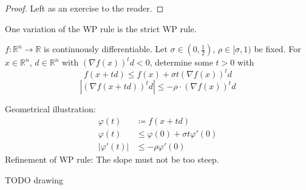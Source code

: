\documentclass[a4paper]{article}
\numberwithin{lecref}{subsection}
\newcommand{\Abs}[1]{\left|#1\right|}
\begin{document}
\begin{proof}
	Left as an exercise to the reader.
\end{proof}

One variation of the WP rule is the strict WP rule.

$f: \mathbb R^n \to \mathbb R$ is continuously differentiable.
Let $\sigma \in (0, \frac12)$, $\rho \in [\sigma, 1)$ be fixed.
For $x \in \mathbb R^n$, $d \in \mathbb R^n$ with $(\nabla f(x))^t d < 0$, determine some $t > 0$ with
\[ f(x + td) \leq f(x) + \sigma t(\nabla f(x))^t d \]
\[ \Abs{(\nabla f(x + td))^t d} \leq -\rho \cdot (\nabla f(x))^t d \]

Geometrical illustration:
\begin{align*}
	\varphi(t) &\coloneqq f(x + td) \\
	\varphi(t) &\leq \varphi(0) + \sigma t \varphi'(0) \\
	\Abs{\varphi'(t)} &\leq -\rho \varphi'(0)
\end{align*}
Refinement of WP rule: The slope must not be too steep.

TODO drawing
\end{document}
